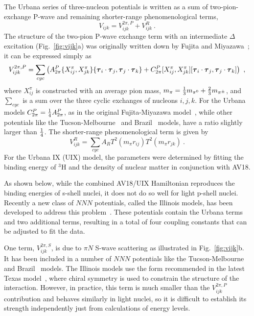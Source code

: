 The Urbana series of three-nucleon potentials is written as a sum of
two-pion-exchange P-wave and remaining shorter-range phenomenological terms,
\begin{equation}
   V_{ijk} = V^{2\pi,P}_{ijk} + V^{R}_{ijk} ~.
\end{equation}
The structure of the two-pion P-wave exchange term with an intermediate
$\Delta$ excitation (Fig.~\ref{fig:vijk}a) 
was originally written down by Fujita and Miyazawa~\cite{FM57}; it
can be expressed simply as
\begin{equation}
   V^{2\pi,P}_{ijk} = \sum_{cyc} \left( A^P_{2\pi}
     \{X^{\pi}_{ij},X^{\pi}_{jk}\}
     \{\mbox{\boldmath$\tau$}_{i}\cdot\mbox{\boldmath$\tau$}_{j},\mbox{\boldmath$\tau$}_{j}\cdot\mbox{\boldmath$\tau$}_{k}\}
   + C^P_{2\pi} [X^{\pi}_{ij},X^{\pi}_{jk}]
     [\mbox{\boldmath$\tau$}_{i}\cdot\mbox{\boldmath$\tau$}_{j},\mbox{\boldmath$\tau$}_{j}\cdot\mbox{\boldmath$\tau$}_{k}] \right ) \ ,
\end{equation}
where $X^{\pi}_{ij}$ is constructed with an average pion mass,
$m_{\pi}=\textstyle{1\over3}m_{\pi^0}+\textstyle{2\over3}m_{\pi^{\pm}}$, and $\sum_{cyc}$
is a sum over the three cyclic exchanges of nucleons $i,j,k$.
For the Urbana models $C^P_{2\pi} = \textstyle{1\over4}A^P_{2\pi}$, as in the original
Fujita-Miyazawa model~\cite{FM57}, while other potentials like the 
Tucson-Melbourne~\cite{TM} and Brazil~\cite{Brazil} models, have a ratio 
slightly larger than $\textstyle{1\over4}$.
The shorter-range phenomenological term is given by
\begin{equation}
   V^{R}_{ijk} = \sum_{cyc} A_R T^2(m_{\pi}r_{ij}) T^2(m_{\pi}r_{jk}) \ .
\label{eq:vrijk}
\end{equation}
For the Urbana IX (UIX) model, the parameters were determined by fitting 
the binding energy of $^3$H and the density of nuclear matter in conjunction 
with AV18.

As shown below, while the combined AV18/UIX Hamiltonian reproduces the
binding energies of s-shell nuclei, it does not do so well for light 
p-shell nuclei.
Recently a new class of $N\!N\!N$ potentials, called the Illinois models, has 
been developed to address this problem~\cite{PPWC01}.  
These potentials contain the Urbana terms and two additional terms, resulting 
in a total of four coupling constants that can be adjusted to fit the data.  

One term, $V^{2\pi,S}_{ijk}$, is due to $\pi N$ S-wave scattering as 
illustrated in Fig.~\ref{fig:vijk}b. 
It has been included in a number of $N\!N\!N$ potentials like the 
Tucson-Melbourne~\cite{TM} and Brazil~\cite{Brazil} models.
The Illinois models use the form recommended in the latest Texas model~\cite{Texas}, 
where chiral symmetry is used to constrain the structure of the interaction.
However, in practice, this term is much smaller than the $V^{2\pi,P}_{ijk}$
contribution and behaves similarly in light nuclei, so it is difficult to
establish its strength independently just from calculations of energy levels.

